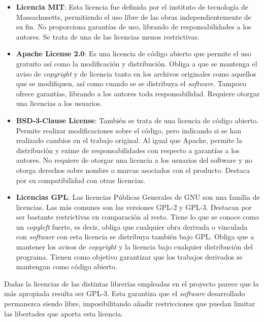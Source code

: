 \begin{itemize}
	\item \textbf{Licencia MIT}: Esta licencia fue definida por el instituto de tecnología de Massachusetts, permitiendo el uso libre de las obras independientemente de su fin. No proporciona garantías de uso, librando de responsabilidades a los autores. Se trata de una de las licencias menos restrictivas.
	\item \textbf{Apache License 2.0}: Es una licencia de código abierto que permite el uso gratuito así como la modificación y distribución. Obliga a que se mantenga el aviso de \textit{copyright} y de licencia tanto en los archivos originales como aquellos que se modifiquen, así como cuando se se distribuya el \textit{software}. Tampoco ofrece garantías, librando a los autores toda responsabilidad. Requiere otorgar una licencias a los usuarios.
	
	\item \textbf{BSD-3-Clause License}: También se trata de una licencia de código abierto. Permite realizar modificaciones sobre el código, pero indicando si se han realizado cambios en el trabajo original. Al igual que Apache, permite la distribución y exime de responsabilidades con respecto a garantías a los autores. No requiere de otorgar una licencia a los usuarios del software y no otorga derechos sobre nombre o marcas asociados con el producto. Destaca por su compatibilidad con otras licencias.
	
	\item \textbf{Licencias GPL}: Las licencias Públicas Generales de GNU son una familia de licencias. Las más comunes son las versiones GPL-2 y GPL-3. Destacan por ser bastante restrictivas en comparación al resto. Tiene lo que se conoce como un \textit{copyleft} fuerte, es decir, obliga que cualquier obra derivada o vinculada con \textit{software} con esta licencia se distribuya también bajo GPL. Obliga que a mantener los avisos de \textit{copyright} y la licencia bajo cualquier distribución del programa. Tienen como objetivo garantizar que los trabajos derivados se mantengan como código abierto.
	
\end{itemize}

Dadas la licencias de las distintas librerías empleadas en el proyecto parece que la más apropiada resulta ser GPL-3. Esta garantiza que el \textit{software} desarrollado permanezca siendo libre, imposibilitando añadir restricciones que puedan limitar las libertades que aporta esta licencia.


